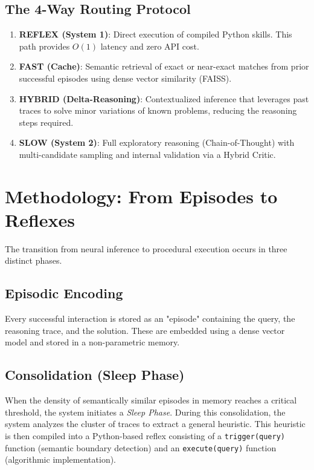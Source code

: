 \documentclass[11pt,a4paper]{article}
\begin{document}
\subsection{The 4-Way Routing Protocol}
\begin{enumerate}
    \item \textbf{REFLEX (System 1)}: Direct execution of compiled Python skills. This path provides $O(1)$ latency and zero API cost.
    \item \textbf{FAST (Cache)}: Semantic retrieval of exact or near-exact matches from prior successful episodes using dense vector similarity (FAISS).
    \item \textbf{HYBRID (Delta-Reasoning)}: Contextualized inference that leverages past traces to solve minor variations of known problems, reducing the reasoning steps required.
    \item \textbf{SLOW (System 2)}: Full exploratory reasoning (Chain-of-Thought) with multi-candidate sampling and internal validation via a Hybrid Critic.
\end{enumerate}

\section{Methodology: From Episodes to Reflexes}
The transition from neural inference to procedural execution occurs in three distinct phases.

\subsection{Episodic Encoding}
Every successful interaction is stored as an "episode" containing the query, the reasoning trace, and the solution. These are embedded using a dense vector model and stored in a non-parametric memory.

\subsection{Consolidation (Sleep Phase)}
When the density of semantically similar episodes in memory reaches a critical threshold, the system initiates a \textit{Sleep Phase}. During this consolidation, the system analyzes the cluster of traces to extract a general heuristic. This heuristic is then compiled into a Python-based reflex consisting of a \texttt{trigger(query)} function (semantic boundary detection) and an \texttt{execute(query)} function (algorithmic implementation).
\end{document}
